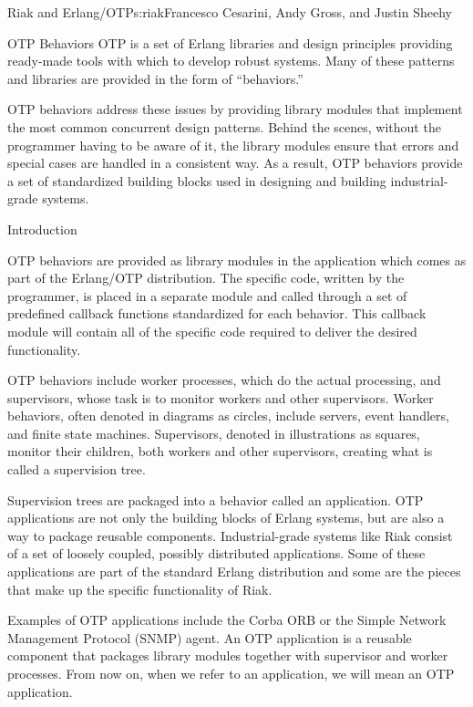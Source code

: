 \begin{aosachapter}{Riak and Erlang/OTP}{s:riak}{Francesco Cesarini, Andy Gross, and Justin Sheehy}
\begin{aosasect1}{OTP Behaviors}
OTP is a set of Erlang libraries and design principles providing
ready-made tools with which to develop robust systems. Many of these
patterns and libraries are provided in the form of ``behaviors.''

OTP behaviors address these issues by providing library modules that
implement the most common concurrent design patterns. Behind the
scenes, without the programmer having to be aware of it, the library
modules ensure that errors and special cases are handled in a
consistent way. As a result, OTP behaviors provide a set of
standardized building blocks used in designing and building
industrial-grade systems.

\begin{aosasect2}{Introduction}

OTP behaviors are provided as library modules in the 
application which comes as part of the Erlang/OTP distribution. The
specific code, written by the programmer, is placed in a separate
module and called through a set of predefined callback functions
standardized for each behavior. This callback module will contain all
of the specific code required to deliver the desired functionality.

OTP behaviors include worker processes, which do the actual
processing, and supervisors, whose task is to monitor workers and
other supervisors. Worker behaviors, often denoted in diagrams as
circles, include servers, event handlers, and finite state
machines. Supervisors, denoted in illustrations as squares, monitor
their children, both workers and other supervisors, creating what is
called a supervision tree.


Supervision trees are packaged into a behavior called an
application. OTP applications are not only the building blocks of
Erlang systems, but are also a way to package reusable
components. Industrial-grade systems like Riak consist of a set of
loosely coupled, possibly distributed applications. Some of these
applications are part of the standard Erlang distribution and some are
the pieces that make up the specific functionality of Riak.

Examples of OTP applications include the Corba ORB or the Simple
Network Management Protocol (SNMP) agent. An OTP application is a
reusable component that packages library modules together with
supervisor and worker processes. From now on, when we refer to an
application, we will mean an OTP application.


\end{aosasect2}
\end{aosasect1}
\end{aosachapter}
